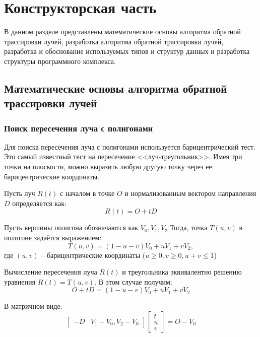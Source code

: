 \chapter{Конструкторская часть}

В данном разделе представлены математические основы алгоритма обратной трассировки лучей, разработка алгоритма обратной трассировки лучей, разработка и обоснование используемых типов и структур данных и разработка структуры программного комплекса.

\section{Математические основы алгоритма обратной трассировки лучей}

\subsection{Поиск пересечения луча с полигонами}

Для поиска пересечения луча с полигонами используется барицентрический тест. Это самый известный тест на пересечение <<луч-треугольник>>. Имея три точки на плоскости, можно выразить любую другую точку через ее барицентрические координаты.

Пусть луч $R(t)$ с началом в точке $O$ и нормализованным вектором направления $D$ определяется как:
\begin{equation}
	R(t) = O + tD
\end{equation}

Пусть вершины полигона обозначаются как $V_0, V_1, V_2$
Тогда, точка $T(u,v)$ в полигоне задаётся выражением:
\begin{equation}
	T(u,v) = (1 - u - v)V_0 + uV_1 + vV_2,
\end{equation}
где $(u,v)$ -- барицентрические координаты ($u \geq 0, v \geq 0, u + v \leq 1$)

Вычисление пересечения луча $R(t)$ и треугольника эквивалентно решению уравнения
$R(t) = T(u, v)$. В этом случае получим:
\begin{equation}
	O + tD = (1- u - v)V_0 + uV_1 + vV_2
\end{equation}

В матричном виде:
\begin{equation}
\begin{bmatrix}
	-D & V_1 - V_0, V_2 - V_0
\end{bmatrix}
\begin{bmatrix}
t\\
u\\
v
\end{bmatrix} = O - V_0 
\end{equation}


